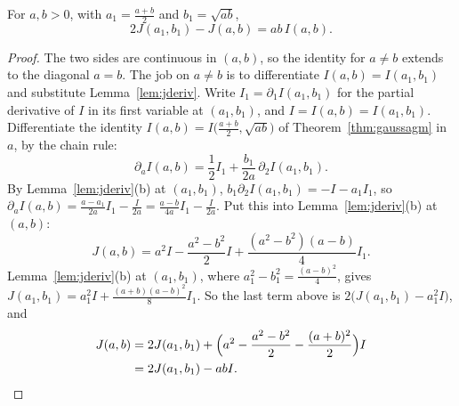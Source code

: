 \begin{proposition}\label{prop:jstep}
For $a,b>0$, with $a_1=\frac{a+b}2$ and $b_1=\sqrt{ab}$,
\[
2J(a_1,b_1)-J(a,b)=ab\,I(a,b).
\]
\end{proposition}
\begin{proof}
The two sides are continuous in $(a,b)$, so the identity for $a\ne b$ extends to the diagonal $a=b$. The job on $a\ne b$ is to differentiate $I(a,b)=I(a_1,b_1)$ and substitute Lemma~\ref{lem:jderiv}. Write $I_1=\partial_1I(a_1,b_1)$ for the partial derivative of $I$ in its first variable at
$(a_1,b_1)$, and $I=I(a,b)=I(a_1,b_1)$. Differentiate the identity $I(a,b)=I\bigl(\frac{a+b}2,\sqrt{ab}\bigr)$ of Theorem~\ref{thm:gaussagm} in $a$, by the chain rule:
\[
\partial_aI(a,b)=\frac12I_1+\frac{b_1}{2a}\,\partial_2I(a_1,b_1).
\]
By Lemma~\ref{lem:jderiv}(b) at $(a_1,b_1)$, $b_1\partial_2I(a_1,b_1)=-I-a_1I_1$, so $\partial_aI(a,b)=\frac{a-a_1}{2a}I_1-\frac I{2a}=\frac{a-b}{4a}I_1-\frac I{2a}$. Put this
into Lemma~\ref{lem:jderiv}(b) at $(a,b)$:
\[
J(a,b)=a^2I-\frac{a^2-b^2}2I+\frac{(a^2-b^2)(a-b)}4I_1.
\]
Lemma~\ref{lem:jderiv}(b) at $(a_1,b_1)$, where $a_1^2-b_1^2=\frac{(a-b)^2}4$, gives $J(a_1,b_1)=a_1^2I+\frac{(a+b)(a-b)^2}8I_1$. So the last term above is
$2\bigl(J(a_1,b_1)-a_1^2I\bigr)$, and
\[
\begin{aligned}J(a,b)&=2J(a_1,b_1)+\Bigl(a^2-\frac{a^2-b^2}2-\frac{(a+b)^2}2\Bigr)I\\&=2J(a_1,b_1)-abI.\end{aligned}
\]
\end{proof}

